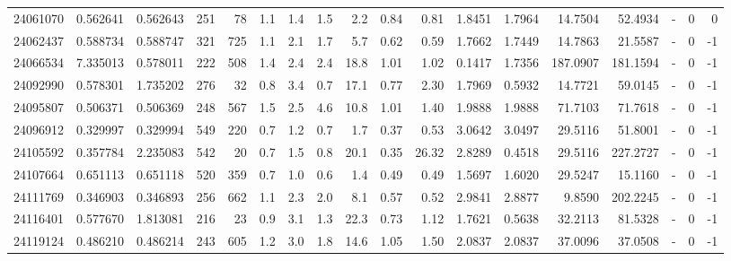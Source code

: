 \begin{tabular}{rrrrrrrrrrrrrrrlrr}
  24061070 & 0.562641 &   0.562643 &  251 &   78 &      1.1 &      1.4 &     1.5 &      2.2 &       0.84 &        0.81 &  1.8451 &  1.7964 &   14.7504 &   52.4934 &             - &        0 &          0 \\
  24062437 & 0.588734 &   0.588747 &  321 &  725 &      1.1 &      2.1 &     1.7 &      5.7 &       0.62 &        0.59 &  1.7662 &  1.7449 &   14.7863 &   21.5587 &             - &        0 &         -1 \\
  24066534 & 7.335013 &   0.578011 &  222 &  508 &      1.4 &      2.4 &     2.4 &     18.8 &       1.01 &        1.02 &  0.1417 &  1.7356 &  187.0907 &  181.1594 &             - &        0 &         -1 \\
  24092990 & 0.578301 &   1.735202 &  276 &   32 &      0.8 &      3.4 &     0.7 &     17.1 &       0.77 &        2.30 &  1.7969 &  0.5932 &   14.7721 &   59.0145 &             - &        0 &         -1 \\
  24095807 & 0.506371 &   0.506369 &  248 &  567 &      1.5 &      2.5 &     4.6 &     10.8 &       1.01 &        1.40 &  1.9888 &  1.9888 &   71.7103 &   71.7618 &             - &        0 &         -1 \\
  24096912 & 0.329997 &   0.329994 &  549 &  220 &      0.7 &      1.2 &     0.7 &      1.7 &       0.37 &        0.53 &  3.0642 &  3.0497 &   29.5116 &   51.8001 &             - &        0 &         -1 \\
  24105592 & 0.357784 &   2.235083 &  542 &   20 &      0.7 &      1.5 &     0.8 &     20.1 &       0.35 &       26.32 &  2.8289 &  0.4518 &   29.5116 &  227.2727 &             - &        0 &         -1 \\
  24107664 & 0.651113 &   0.651118 &  520 &  359 &      0.7 &      1.0 &     0.6 &      1.4 &       0.49 &        0.49 &  1.5697 &  1.6020 &   29.5247 &   15.1160 &             - &        0 &         -1 \\
  24111769 & 0.346903 &   0.346893 &  256 &  662 &      1.1 &      2.3 &     2.0 &      8.1 &       0.57 &        0.52 &  2.9841 &  2.8877 &    9.8590 &  202.2245 &             - &        0 &         -1 \\
  24116401 & 0.577670 &   1.813081 &  216 &   23 &      0.9 &      3.1 &     1.3 &     22.3 &       0.73 &        1.12 &  1.7621 &  0.5638 &   32.2113 &   81.5328 &             - &        0 &         -1 \\
  24119124 & 0.486210 &   0.486214 &  243 &  605 &      1.2 &      3.0 &     1.8 &     14.6 &       1.05 &        1.50 &  2.0837 &  2.0837 &   37.0096 &   37.0508 &             - &        0 &         -1 \\

\end{tabular}
